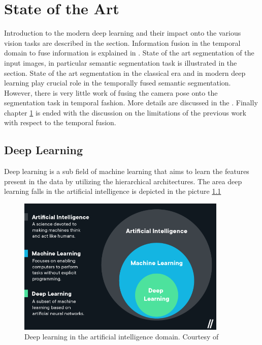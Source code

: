 

    \chapter{State of the Art}
	\label{chap:stateofart}
	Introduction to the modern deep learning and their impact onto the various vision tasks are described in the  section. Information fusion in the temporal domain to fuse information is explained in . State of the art segmentation of the input images, in particular semantic segmentation task is illustrated in the  section. State of the art segmentation in the classical era and in modern deep learning play crucial role in the temporally fused semantic segmentation. However, there is very little work of fusing the camera pose onto the segmentation task in temporal fashion. More details are discussed in the . Finally chapter \ref{chap:stateofart} is ended with the discussion on the limitations of the previous work with respect to the temporal fusion. 
	
    \section{Deep Learning}
    \label{sec:deeplearn}
    
    Deep learning is a sub field of machine learning that aims to learn the features present in the data by utilizing the hierarchical architectures. The area deep learning falls in the artificial intelligence is depicted in the picture \ref{fig:DLAI}
    
    \begin{figure}[h]
    	\centering
    	\includegraphics[width=10cm]{images/mldl.png}
    	\caption{Deep learning in the artificial intelligence domain. Courtesy of \cite{35_mldl}}
    	\label{fig:DLAI}
    \end{figure}  
    
